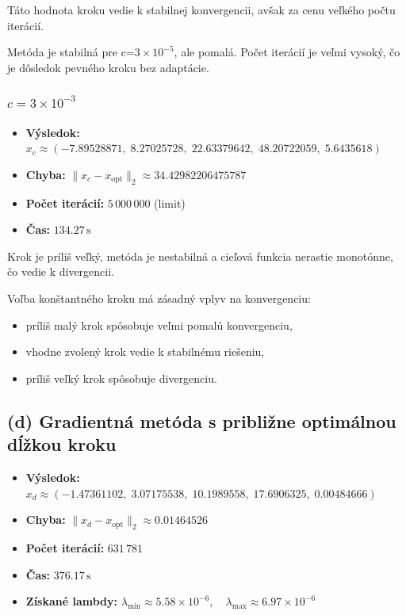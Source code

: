 \documentclass[titlepage]{article}
\begin{document}
Táto hodnota kroku vedie k stabilnej konvergencii, avšak za cenu veľkého počtu iterácií.

Metóda je stabilná pre c=$3 \times 10^{-5}$, ale pomalá. Počet iterácií je veľmi vysoký, čo je dôsledok pevného kroku bez adaptácie.

\subsubsection*{$c = 3 \times 10^{-3}$}

\begin{itemize}
    \item \textbf{Výsledok:} $x_c \approx (-7.89528871,\; 8.27025728,\; 22.63379642,\; 48.20722059,\; 5.6435618)$
    \item \textbf{Chyba:} $\|x_c - x_{\text{opt}}\|_2 \approx 34.42982206475787$
    \item \textbf{Počet iterácií:} $5\,000\,000$ (limit)
    \item \textbf{Čas:} $134.27\,\mathrm{s}$
\end{itemize}

Krok je príliš veľký, metóda je nestabilná a cieľová funkcia nerastie monotónne, čo vedie k divergencii.



Voľba konštantného kroku má zásadný vplyv na konvergenciu:
\begin{itemize}
    \item príliš malý krok spôsobuje veľmi pomalú konvergenciu,
    \item vhodne zvolený krok vedie k stabilnému riešeniu,
    \item príliš veľký krok spôsobuje divergenciu.
\end{itemize}

\subsection*{(d) Gradientná metóda s približne optimálnou dĺžkou kroku}

\begin{itemize}
    \item \textbf{Výsledok:} $x_d \approx (-1.47361102,\; 3.07175538,\; 10.1989558,\; 17.6906325,\; 0.00484666)$
    \item \textbf{Chyba:} $\|x_d - x_{\text{opt}}\|_2 \approx 0.01464526$
    \item \textbf{Počet iterácií:} $631\,781$
    \item \textbf{Čas:} $376.17\,\mathrm{s}$
    \item \textbf{Získané lambdy:} $\lambda_{\min} \approx 5.58 \times 10^{-6}, \quad \lambda_{\max} \approx 6.97 \times 10^{-6}$
\end{itemize}
\end{document}
